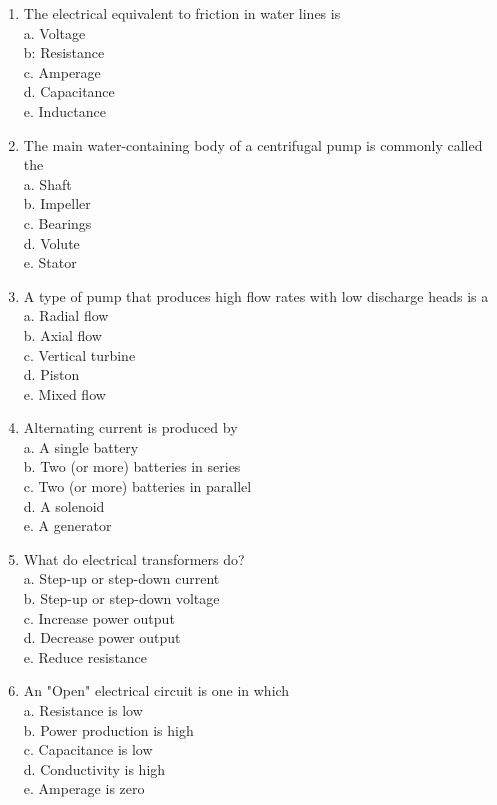 \documentclass{article}
\begin{document}
\begin{enumerate}[1.]
\item The electrical equivalent to friction in water lines is\\
a. Voltage\\
b: Resistance\\
c. Amperage\\
d. Capacitance\\
e. Inductance

  
\item The main water-containing body of a centrifugal pump is commonly called the\\
a. Shaft\\
b. Impeller\\
c. Bearings\\
d. Volute\\
e. Stator

\item A type of pump that produces high flow rates with low discharge heads is a\\
a. Radial flow\\

b. Axial flow\\

c. Vertical turbine\\

d. Piston\\

e. Mixed flow\\

\item Alternating current is produced by\\
a. A single battery\\
b. Two (or more) batteries in series\\
c. Two (or more) batteries in parallel\\
d. A solenoid\\
e. A generator\\ 

\item What do electrical transformers do?\\
a. Step-up or step-down current\\
b. Step-up or step-down voltage\\
c. Increase power output\\
d. Decrease power output\\
e. Reduce resistance\\

\item An "Open" electrical circuit is one in which\\
a. Resistance is low\\
b. Power production is high\\
c. Capacitance is low\\
d. Conductivity is high\\
e. Amperage is zero


\end{enumerate}
\end{document}

